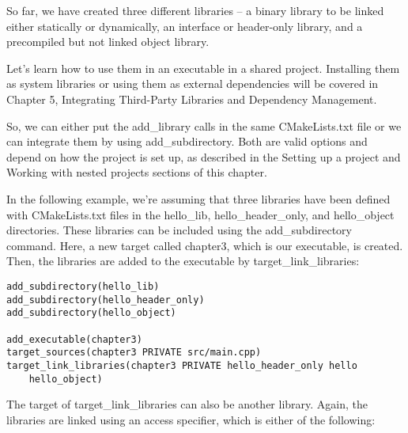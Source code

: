 So far, we have created three different libraries – a binary library to be linked either statically or dynamically, an interface or header-only library, and a precompiled but not linked object library.

Let's learn how to use them in an executable in a shared project. Installing them as system libraries or using them as external dependencies will be covered in Chapter 5, Integrating Third-Party Libraries and Dependency Management.

So, we can either put the add\_library calls in the same CMakeLists.txt file or we can integrate them by using add\_subdirectory. Both are valid options and depend on how the project is set up, as described in the Setting up a project and Working with nested projects sections of this chapter.

In the following example, we're assuming that three libraries have been defined with CMakeLists.txt files in the hello\_lib, hello\_header\_only, and hello\_object directories. These libraries can be included using the add\_subdirectory command. Here, a new target called chapter3, which is our executable, is created. Then, the libraries are added to the executable by target\_link\_libraries:

\begin{lstlisting}[style=styleCMake]
add_subdirectory(hello_lib)
add_subdirectory(hello_header_only)
add_subdirectory(hello_object)

add_executable(chapter3)
target_sources(chapter3 PRIVATE src/main.cpp)
target_link_libraries(chapter3 PRIVATE hello_header_only hello
	hello_object)
\end{lstlisting}

The target of target\_link\_libraries can also be another library. Again, the libraries are linked using an access specifier, which is either of the following:

